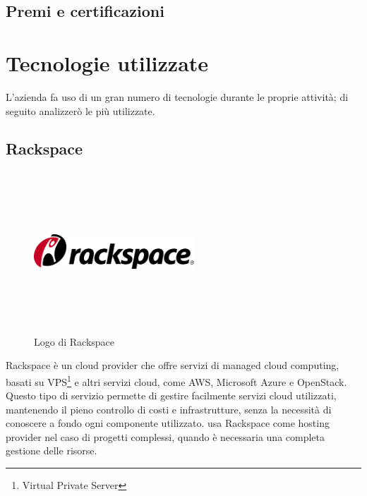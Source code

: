    \subsection{Premi e certificazioni}

\section{Tecnologie utilizzate}
L'azienda fa uso di un gran numero di tecnologie durante le proprie attività; di seguito analizzerò le più utilizzate.

   \subsection{Rackspace}
   \begin{figure}[H]
      \begin{center}
         \includegraphics[width=6cm,height=6cm,keepaspectratio]{immagini/rackspace-logo}
      \end{center}
      \caption{Logo di Rackspace}\label{logorackspace}
   \end{figure}
   Rackspace è un cloud provider che offre servizi di managed cloud computing, basati su VPS\footnote{Virtual Private Server} e altri servizi cloud, come AWS, Microsoft Azure e OpenStack. Questo tipo di servizio permette di gestire facilmente servizi cloud utilizzati, mantenendo il pieno controllo di costi e infrastrutture, senza la necessità di conoscere a fondo ogni componente utilizzato.
   \nomeAzienda{} usa Rackspace come hosting provider nel caso di progetti complessi, quando è necessaria una completa gestione delle risorse.

